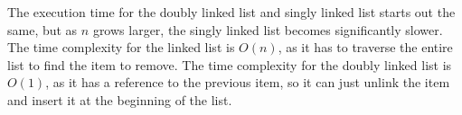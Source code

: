 \documentclass[a4paper,11pt]{article}
\begin{document}
    The execution time for the doubly linked list and singly linked list starts out the same, but as $n$ grows larger, the singly linked list becomes significantly slower. The time complexity for the linked list is $O(n)$, as it has to traverse the entire list to find the item to remove. The time complexity for the doubly linked list is $O(1)$, as it has a reference to the previous item, so it can just unlink the item and insert it at the beginning of the list.
\end{document}
